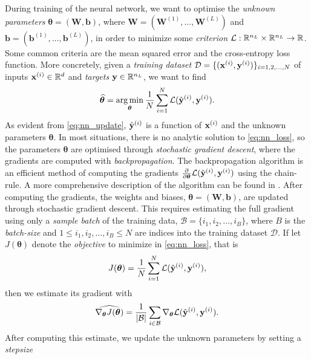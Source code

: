 \documentclass{statsmsc}
\begin{document}
{During training of the neural network, we want to optimise the \textit{unknown
parameters} $\bm{\theta}=(\mathbf{W}, \mathbf{b})$, where
$\mathbf{W}=\left(\boldsymbol{W}^{(1)},\dots,\boldsymbol{W}^{(L)}\right)$ and
$\mathbf{b}=\left(\boldsymbol{b}^{(1)},\dots,\boldsymbol{b}^{(L)}\right)$, in
order to minimize some \textit{criterion} $\mathcal{L}: \mathbb{R}^{n_L} \times \mathbb{R}^{n_L}
\rightarrow {\mathbb{R}}$. Some common criteria are the mean squared error and the
cross-entropy loss function.
More concretely, given a \textit{training dataset }
$\mathcal{D}=\{(\mathbf{x}^{(i)}, \mathbf{y}^{(i)})\}_{i=1,2,\dots,N}$ of inputs
$\mathbf{x}^{(i)} \in \mathbb{R}^d$ and \textit{targets} $\mathbf{y} \in \mathbb{R}^{n_L}$, we want to find
\begin{equation}\label{eq:nn_loss}
    \widehat{\bm\theta}= \operatorname*{arg\,min}_{\bm\theta}
    \frac{1}{N}  \sum^{N}_{i=1} \mathcal{L}(\hat{\mathbf{y}}^{(i)}, \mathbf{y}^{(i)}).
\end{equation}
As evident from \cref{eq:nn_update}, $\hat{\mathbf{y}}^{(i)}$ is a function of
$\mathbf{x}^{(i)}$ and the unknown parameters $\bm\theta$.
In most situations, there is no analytic solution to \cref{eq:nn_loss}, so
the parameters $\bm\theta$ are optimised through \textit{stochastic gradient descent},
where the gradients are computed with \textit{backpropagation}.
The backpropagation algorithm is an efficient method of computing the gradients
$\frac{\partial }{\partial \bm\theta} \mathcal{L}(\hat{\mathbf{y}}^{(i)}, \mathbf{y}^{(i)}) $
using the chain-rule. A more comprehensive description of the algorithm can be
found in \cite{backprop}.
After computing the gradients, the weights and biases, $\bm\theta=(\mathbf{W},\mathbf{b})$, are updated through
stochastic gradient descent. This requires estimating
the full gradient using only a \textit{sample batch} of the training data,
$\mathcal{B}=\{i_1,i_2,\dots,i_B\}$, where $B$ is the \textit{batch-size} and
$1\leq i_1,i_2,\dots,i_B \leq N$ are indices into the training dataset $\mathcal{D}$.
If let $J(\bm\theta)$ denote the \textit{objective} to minimize in \cref{eq:nn_loss}, that is
\begin{equation}
    J(\bm\theta)=\frac{1}{N} \sum^{N}_{i=1} \mathcal{L}(\hat{\mathbf{y}}^{(i)}, {\mathbf{y}}^{(i)}),
\end{equation}
then we estimate its gradient with
\begin{equation}
    \widehat{\nabla_{\bm\theta} J(\bm\theta)} = \frac{1}{|\mathcal{B}|} \sum_{i \in \mathcal{B}}
    \nabla_{\bm\theta} \mathcal{L}(\hat{\mathbf{y}}^{(i)}, {\mathbf{y}}^{(i)}).
\end{equation}
After computing this estimate, we update the unknown parameters by setting a \textit{stepsize}
}
\end{document}
